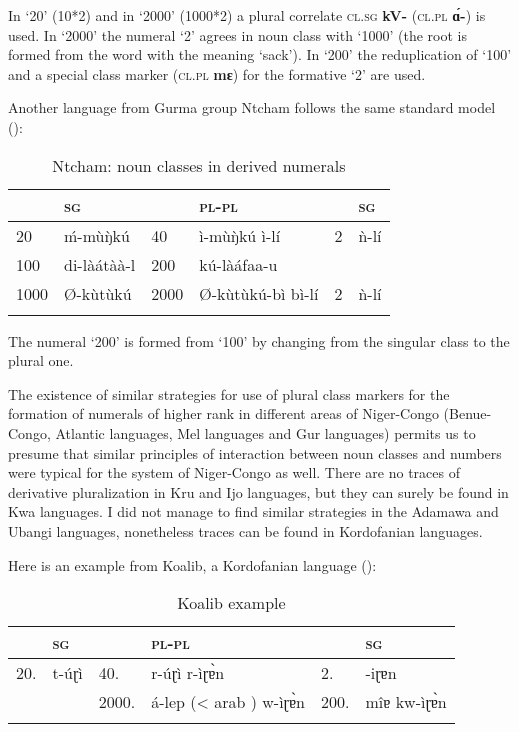 In ‘20’ (10*2) and in ‘2000’ (1000*2) a plural correlate \textsc{cl}.\textsc{sg} \textbf{kV-} (\textsc{cl}.\textsc{pl} \textbf{{\'{ɑ}}-}) is used. In ‘2000’ the numeral ‘2’ agrees in noun class with ‘1000’ (the root is formed from the word with the meaning ‘sack’). In ‘200’ the reduplication of ‘100’ and a special class marker (\textsc{cl}.\textsc{pl} \textbf{mɛ}) for the formative ‘2’ are used. 

Another language from Gurma group Ntcham follows the same standard model ():


\begin{table}
\caption{\label{tab:1:18} Ntcham: noun classes in derived numerals}

\begin{tabularx}{\textwidth}{lXlXlX}
\lsptoprule

& \textsc{sg} & & \textsc{pl}-\textsc{pl} & & \textsc{sg}\\
\midrule
20 &  {\'{m}}-m{\`{u}}{\`{ŋ}}kú & 40 &  ì-m{\`{u}}{\`{ŋ}}kú ì-lí & 2 &  {\`{n}}-lí \\
100 &  di-l{\`{a}}át{\`{a}}{\`{a}}-l & 200 &  kú-l{\`{a}}áfaa-u~ & \\
1000 &  Ø-k{\`{u}}t{\`{u}}kú & 2000 &  Ø-k{\`{u}}t{\`{u}}kú-bì  bì-lí & 2 &  {\`{n}}-lí \\
\lspbottomrule
\end{tabularx}
\end{table}


The numeral `200' is formed from `100' by changing from the singular class to the plural one. 

The existence of similar strategies for use of plural class markers for the formation of numerals of higher rank in different areas of Niger-Congo (Benue-Congo, Atlantic languages, Mel languages and Gur languages) permits us to presume that similar principles of interaction between noun classes and numbers were typical for the system of Niger-Congo as well. There are no traces of derivative pluralization in Kru and Ijo languages, but they can surely be found in Kwa languages. I did not manage to find similar strategies in the Adamawa and Ubangi languages, nonetheless traces can be found in Kordofanian languages. 

Here is an example from Koalib, a Kordofanian language (): 

\begin{table}
\caption{Koalib example}
\label{tab:1:19}

\begin{tabularx}{\textwidth}{lllXlX}
\lsptoprule

&\textsc{sg} && \textsc{pl}-\textsc{pl} && \textsc{sg}\\
\midrule
20. &  t-úɽì & 40.   &  r-úɽì r-ìɽ{\`{ɐ}}n            & 2. &  -iɽɐn\\
    &              & 2000. &  á-lep (< arab  ) w-ìɽ{\`{ɐ}}n & 200. &  mîɐ kw-ìɽ{\`{ɐ}}n\\
\lspbottomrule
\end{tabularx}
\end{table}
 


